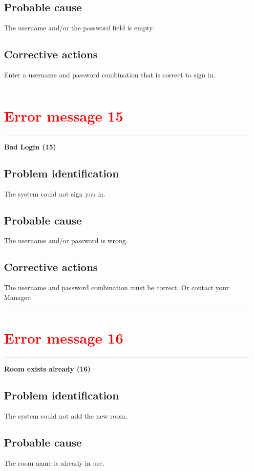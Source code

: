\subsection{Probable cause}
The username and/or the password field is empty.

\subsection{Corrective actions}
Enter a username and password combination that is correct to sign in.
\vspace{0.5cm}
\hrule
\hfill




\section{{\textbf{\textcolor{red}{Error message 15}}}}
\hrule
\vspace{0.5cm}
\textbf{Bad Login (15)}
\subsection{Problem identification}
The system could not sign you in.

\subsection{Probable cause}
The username and/or password is wrong.

\subsection{Corrective actions}
The username and password combination must be correct. Or contact your Manager.
\vspace{0.5cm}
\hrule
\hfill




\section{\textbf{\textcolor{red}{Error message 16}}}
\hrule
\vspace{0.5cm}
\textbf{Room exists already (16)}
\subsection{Problem identification}
The system could not add the new room.

\subsection{Probable cause}
The room name is already in use.

